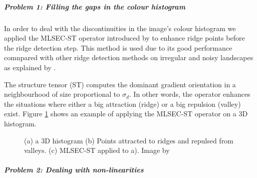 \documentclass[twoside,11pt]{article}
\begin{document}
\subparagraph{Problem 1: Filling the gaps in the colour histogram}

In order to deal with the discontinuities in the image's colour histogram we
applied the MLSEC-ST operator introduced by \cite{crestes} to enhance ridge
points before the ridge detection step. This method is used due to its good
performance comnpared with other ridge detection methods on irregular and noisy
landscapes as explained by \cite{crestes}.

The structure tensor (ST) computes the dominant gradient orientation in a
neighbourhood of size proportional to $\sigma_{d}$. In other words, the operator
enhances the situations where either a big attraction (ridge) or a big repulsion
(valley) exist. Figure \ref{fig:crestes_exp} shows an example of applying the
MLSEC-ST operator on a 3D histogram.

\begin{figure}[!t]
\centering
{}
\caption{(a) a 3D histogram (b) Points attracted to ridges and repulsed from
valleys. (c) MLSEC-ST applied to a). Image by \cite{1478239}}
\label{fig:crestes_exp}
\end{figure}

\subparagraph{Problem 2: Dealing with non-linearities}
\end{document}
